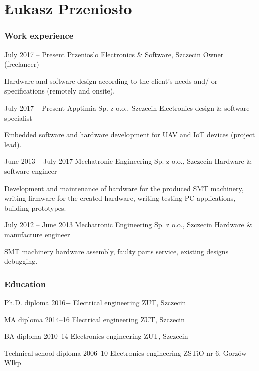 \documentclass{tccv}
\begin{document}
\part{Łukasz Przeniosło}

\section{Work experience}

\begin{eventlist}

\item{July 2017 -- Present}
     {Przenioslo Electronics \& Software, Szczecin}
     {Owner (freelancer)}
     
Hardware and software design according to the client's needs and/ or specifications (remotely and onsite).

\item{July 2017 -- Present}
     {Apptimia Sp. z o.o., Szczecin}
     {Electronics design \& software specialist}
     
Embedded software and hardware development for UAV and IoT devices (project lead).

\item{June 2013 -- July 2017}
     {Mechatronic Engineering Sp. z o.o., Szczecin}
     {Hardware \& software engineer}
     
Development and maintenance of hardware for the produced SMT machinery, writing firmware for the created hardware, writing testing PC applications, building prototypes. 

\item{July 2012 -- June 2013}
     {Mechatronic Engineering Sp. z o.o., Szczecin}
     {Hardware \& manufacture engineer}

SMT machinery hardware assembly, faulty parts service, existing designs debugging. 

\end{eventlist}

\section{Education}

\begin{yearlist}

\item[Ph.D. diploma]{2016+}
     {Electrical engineering}
     {ZUT, Szczecin}

\item[MA diploma]{2014--16}
     {Electrical engineering}
     {ZUT, Szczecin}

\item[BA diploma]{2010--14}
     {Electronics engineering}
     {ZUT, Szczecin}

\item[Technical school diploma]{2006--10}
     {Electronics engineering}
     {ZSTiO nr 6, Gorzów Wlkp}

\end{yearlist}
\end{document}
